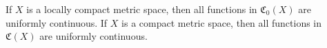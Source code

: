 If $X$ is a locally compact metric space, then all functions in $\mathfrak{C}_0(X)$ are uniformly continuous. If $X$ is a compact metric space, then all functions in $\mathfrak{C}(X)$ are uniformly continuous.